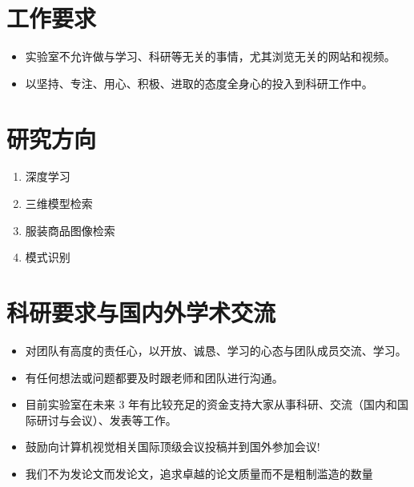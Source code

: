 \documentclass[a4paper，12pt]{article}
\begin{document}
\section{工作要求}

\begin{itemize}

\item 实验室不允许做与学习、科研等无关的事情，尤其浏览无关的网站和视频。

\item 以坚持、专注、用心、积极、进取的态度全身心的投入到科研工作中。

\end{itemize}

\section{研究方向}

\begin{enumerate}

\item 深度学习

\item 三维模型检索

\item 服装商品图像检索

\item 模式识别

\end{enumerate}

\section{科研要求与国内外学术交流}

\begin{itemize}

\item 对团队有高度的责任心，以开放、诚恳、学习的心态与团队成员交流、学习。

\item 有任何想法或问题都要及时跟老师和团队进行沟通。

\item 目前实验室在未来 3 年有比较充足的资金支持大家从事科研、交流（国内和国际研讨与会议）、发表等工作。

\item 鼓励向计算机视觉相关国际顶级会议投稿并到国外参加会议!

\item 我们不为发论文而发论文，追求卓越的论文质量而不是粗制滥造的数量

\end{itemize}
\end{document}
